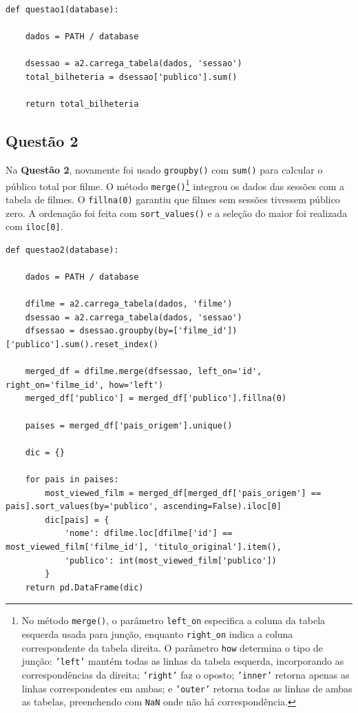\documentclass{article}
\begin{document}
\linespread{1}
\begin{lstlisting}
def questao1(database):
    
    dados = PATH / database

    dsessao = a2.carrega_tabela(dados, 'sessao')
    total_bilheteria = dsessao['publico'].sum()

    return total_bilheteria

\end{lstlisting}
\linespread{1.5}
\subsection*{Questão 2}
Na \textbf{Questão 2}, novamente foi usado \texttt{groupby()} com \texttt{sum()} para calcular o público total por filme. O método \texttt{merge()}\footnote{No método \texttt{merge()}, o parâmetro \texttt{left\_on} especifica a coluna da tabela esquerda usada para junção, enquanto \texttt{right\_on} indica a coluna correspondente da tabela direita. O parâmetro \texttt{how} determina o tipo de junção: \texttt{'left'} mantém todas as linhas da tabela esquerda, incorporando as correspondências da direita; \texttt{'right'} faz o oposto; \texttt{'inner'} retorna apenas as linhas correspondentes em ambas; e \texttt{'outer'} retorna todas as linhas de ambas as tabelas, preenchendo com \texttt{NaN} onde não há correspondência.} integrou os dados das sessões com a tabela de filmes. O \texttt{fillna(0)} garantiu que filmes sem sessões tivessem público zero. A ordenação foi feita com \texttt{sort\_values()} e a seleção do maior foi realizada com \texttt{iloc[0]}.
\linespread{1}
\begin{lstlisting}
def questao2(database):

    dados = PATH / database

    dfilme = a2.carrega_tabela(dados, 'filme')
    dsessao = a2.carrega_tabela(dados, 'sessao')
    dfsessao = dsessao.groupby(by=['filme_id'])['publico'].sum().reset_index()
    
    merged_df = dfilme.merge(dfsessao, left_on='id', right_on='filme_id', how='left')
    merged_df['publico'] = merged_df['publico'].fillna(0)
    
    paises = merged_df['pais_origem'].unique()
    
    dic = {}
    
    for pais in paises:        
        most_viewed_film = merged_df[merged_df['pais_origem'] == pais].sort_values(by='publico', ascending=False).iloc[0]
        dic[pais] = {
            'nome': dfilme.loc[dfilme['id'] == most_viewed_film['filme_id'], 'titulo_original'].item(),
            'publico': int(most_viewed_film['publico'])
        }
    return pd.DataFrame(dic) 
\end{lstlisting}
\end{document}
